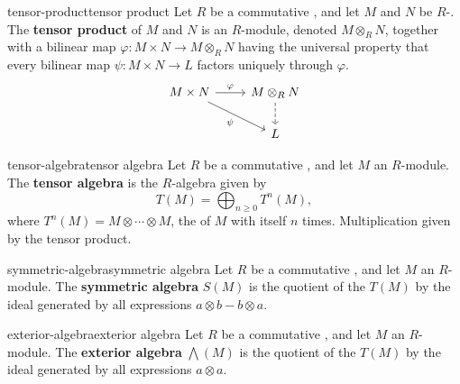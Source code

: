 \begin{topic}{tensor-product}{tensor product}
    Let $R$ be a commutative , and let $M$ and $N$ be $R$-. The \textbf{tensor product} of $M$ and $N$ is an $R$-module, denoted $M \otimes_R N$, together with a bilinear map $\varphi : M \times N \to M \otimes_R N$ having the universal property that every bilinear map $\psi : M \times N \to L$ factors uniquely through $\varphi$.
    \[ \begin{tikzcd} M \times N \arrow{r}{\varphi} \arrow[swap]{dr}{\psi} & M \otimes_R N \arrow[dashed]{d} \\ & L \end{tikzcd} \]
\end{topic}

\begin{topic}{tensor-algebra}{tensor algebra}
    Let $R$ be a commutative , and let $M$ an $R$-module. The \textbf{tensor algebra} is the $R$-algebra given by
    \[ T(M) = \bigoplus_{n \ge 0} T^n(M) , \]
    where $T^n(M) = M \otimes \cdots \otimes M$, the  of $M$ with itself $n$ times. Multiplication given by the tensor product.
\end{topic}

\begin{topic}{symmetric-algebra}{symmetric algebra}
    Let $R$ be a commutative , and let $M$ an $R$-module. The \textbf{symmetric algebra} $S(M)$ is the quotient of the  $T(M)$ by the ideal generated by all expressions $a \otimes b - b \otimes a$.
\end{topic}

\begin{topic}{exterior-algebra}{exterior algebra}
    Let $R$ be a commutative , and let $M$ an $R$-module. The \textbf{exterior algebra} $\bigwedge(M)$ is the quotient of the  $T(M)$ by the ideal generated by all expressions $a \otimes a$.
\end{topic}
